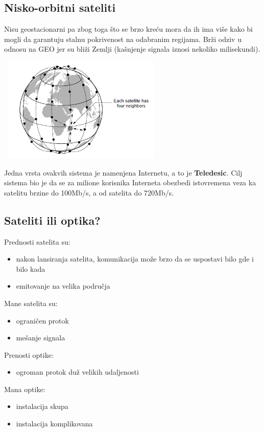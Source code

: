 \documentclass{article} %
\begin{document}
\subsection{Nisko-orbitni sateliti}
Nisu geostacionarni pa zbog toga što se brzo kreću mora da ih ima više kako bi mogli da garantuju stalnu pokrivenost na odabranim regijama. Brži odziv u odnosu na GEO jer su bliži Zemlji (kašnjenje signala iznosi nekoliko milisekundi). \\
\begin{center}
\includegraphics[width=8cm, height=5cm]{LEO}\\
\end{center}
Jedna vrsta ovakvih sistema je namenjena Internetu, a to je \textbf{Teledesic}. Cilj sistema bio je da se za milione korisnika Interneta obezbedi istovremena veza ka satelitu brzine do 100Mb/s, a od satelita do 720Mb/s. 
\subsection{Sateliti ili optika?}
Prednosti satelita su:
\begin{itemize}
  \item nakon lansiranja satelita, komunikacija može brzo da se uspostavi bilo gde i bilo kada
  \item emitovanje na velika područja
\end{itemize} 
Mane satelita su:
\begin{itemize}
  \item ograničen protok
  \item mešanje signala
\end{itemize}
Prenosti optike:
\begin{itemize}
  \item ogroman protok duž velikih udaljenosti
\end{itemize}
Mana optike:
\begin{itemize}
  \item instalacija skupa
  \item instalacija komplikovana
\end{itemize}
\end{document}
